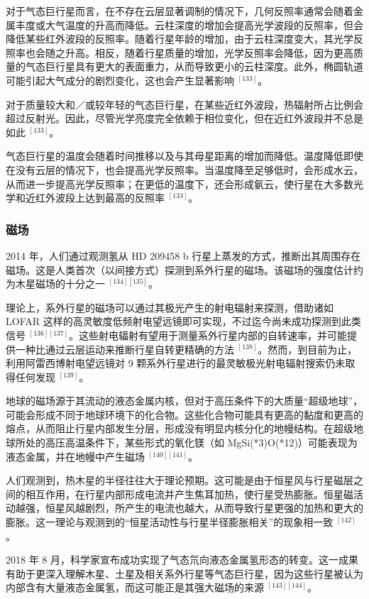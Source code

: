 对于气态巨行星而言，在不存在云层显著调制的情况下，几何反照率通常会随着金属丰度或大气温度的升高而降低。云柱深度的增加会提高光学波段的反照率，但会降低某些红外波段的反照率。随着行星年龄的增加，由于云柱深度变大，其光学反照率也会随之升高。相反，随着行星质量的增加，光学反照率会降低，因为更高质量的气态巨行星具有更大的表面重力，从而导致更小的云柱深度。此外，椭圆轨道可能引起大气成分的剧烈变化，这也会产生显著影响 $^{[133]}$。

对于质量较大和／或较年轻的气态巨行星，在某些近红外波段，热辐射所占比例会超过反射光。因此，尽管光学亮度完全依赖于相位变化，但在近红外波段并不总是如此 $^{[133]}$。

气态巨行星的温度会随着时间推移以及与其母星距离的增加而降低。温度降低即使在没有云层的情况下，也会提高光学反照率。当温度降至足够低时，会形成水云，从而进一步提高光学反照率；在更低的温度下，还会形成氨云，使行星在大多数光学和近红外波段上达到最高的反照率 $^{[133]}$。
\subsubsection{磁场}
2014 年，人们通过观测氢从 HD 209458 b 行星上蒸发的方式，推断出其周围存在磁场。这是人类首次（以间接方式）探测到系外行星的磁场。该磁场的强度估计约为木星磁场的十分之一 $^{[134][135]}$。

理论上，系外行星的磁场可以通过其极光产生的射电辐射来探测，借助诸如 LOFAR 这样的高灵敏度低频射电望远镜即可实现，不过迄今尚未成功探测到此类信号 $^{[136][137]}$。这些射电辐射有望用于测量系外行星内部的自转速率，并可能提供一种比通过云层运动来推断行星自转更精确的方法 $^{[138]}$。然而，到目前为止，利用阿雷西博射电望远镜对 9 颗系外行星进行的最灵敏极光射电辐射搜索仍未取得任何发现 $^{[139]}$。

地球的磁场源于其流动的液态金属内核，但对于高压条件下的大质量“超级地球”，可能会形成不同于地球环境下的化合物。这些化合物可能具有更高的黏度和更高的熔点，从而阻止行星内部发生分层，形成没有明显内核分化的地幔结构。在超级地球所处的高压高温条件下，某些形式的氧化镁（如 MgSi(*3)O(*{12})）可能表现为液态金属，并在地幔中产生磁场 $^{[140][141]}$。

人们观测到，热木星的半径往往大于理论预期。这可能是由于恒星风与行星磁层之间的相互作用，在行星内部形成电流并产生焦耳加热，使行星受热膨胀。恒星磁活动越强，恒星风越剧烈，所产生的电流也越大，从而导致行星更强的加热和更大的膨胀。这一理论与观测到的“恒星活动性与行星半径膨胀相关”的现象相一致 $^{[142]}$。

2018 年 8 月，科学家宣布成功实现了气态氘向液态金属氢形态的转变。这一成果有助于更深入理解木星、土星及相关系外行星等气态巨行星，因为这些行星被认为内部含有大量液态金属氢，而这可能正是其强大磁场的来源 $^{[143][144]}$。

